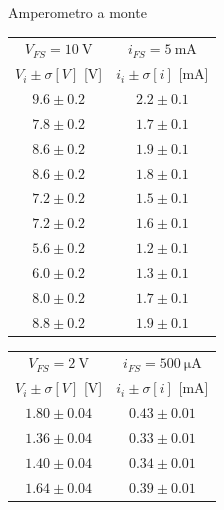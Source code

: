 \documentclass{article}
\begin{document}
\begin{figure}[h]
\begin{center}
    \large{Amperometro a monte}
\end{center}
\begin{multicols}{2}
\begin{center}
\begin{tabular}{c|c} 
$V_{FS}=\SI{10}{\volt}$&$i_{FS}=\SI{5}{\milli\ampere}$\\
$V_i \pm \sigma [V]$ [\si{\volt}] & $i_i \pm \sigma [i]$ [\si{\milli\ampere}]\\
[0.5ex]
\hline
$9.6 \pm 0.2 $&$2.2 \pm 0.1$\\

$7.8 \pm 0.2 $&$1.7 \pm 0.1$\\

$8.6 \pm 0.2 $&$1.9 \pm 0.1$\\

$8.6 \pm 0.2 $&$1.8 \pm 0.1$\\

$7.2 \pm 0.2 $&$1.5 \pm 0.1$\\

$7.2 \pm 0.2 $&$1.6 \pm 0.1$\\

$5.6 \pm 0.2 $&$1.2 \pm 0.1$\\

$6.0 \pm 0.2 $&$1.3 \pm 0.1$\\

$8.0 \pm 0.2 $&$1.7 \pm 0.1$\\

$8.8 \pm 0.2 $&$1.9 \pm 0.1$\\

\end{tabular}
\end{center}

\begin{center}
\begin{tabular}{c|c} 
$V_{FS}=\SI{2}{\volt}$&$i_{FS}=\SI{500}{\micro\ampere}$\\
$V_i \pm \sigma [V]$        [\si{\volt}] & $i_i \pm \sigma [i]$         [\si{\milli\ampere}]\\
[0.5ex]
\hline
$1.80 \pm 0.04 $& $0.43 \pm 0.01$\\
$1.36 \pm 0.04 $&$0.33 \pm 0.01$\\

$1.40 \pm 0.04 $&$0.34 \pm 0.01$\\

$1.64 \pm 0.04 $&$0.39 \pm 0.01$\\


\end{tabular}
\end{center}
\end{multicols}
\end{figure}
\end{document}
